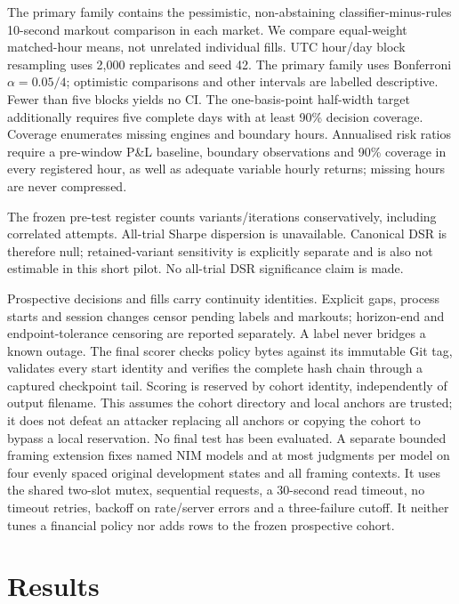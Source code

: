 \documentclass[11pt]{article}
\begin{document}
The primary family contains the pessimistic, non-abstaining classifier-minus-rules
10-second markout comparison in each market. We compare equal-weight matched-hour
means, not unrelated individual fills. UTC hour/day block resampling uses 2,000
replicates and seed 42. The primary family uses Bonferroni $\alpha=0.05/4$; optimistic
comparisons and other intervals are labelled descriptive. Fewer than five blocks
yields no CI. The one-basis-point half-width target additionally requires five
complete days with at least 90\% decision coverage. Coverage enumerates missing
engines and boundary hours. Annualised risk ratios require a pre-window P\&L
baseline, boundary observations and 90\% coverage in every registered hour, as
well as adequate variable hourly returns; missing hours are never compressed.

The frozen pre-test register counts \FrozenTrials{} variants/iterations
conservatively, including correlated attempts. All-trial Sharpe dispersion is
unavailable. Canonical DSR is therefore null; retained-variant sensitivity is
explicitly separate and is also not estimable in this short pilot. No all-trial
DSR significance claim is made.

Prospective decisions and fills carry continuity identities. Explicit gaps,
process starts and session changes censor pending labels and markouts; horizon-end
and endpoint-tolerance censoring are reported separately. A label never bridges
a known outage. The final scorer checks policy bytes against its immutable Git
tag, validates every start identity and verifies the complete hash chain through
a captured checkpoint tail. Scoring is reserved by cohort identity, independently
of output filename. This assumes the cohort directory and local anchors are
trusted; it does not defeat an attacker replacing all anchors or copying the
cohort to bypass a local reservation. No final test has been evaluated. A separate bounded framing extension fixes
\FramingModels{} named NIM models and at most \FramingBudget{} judgments per model
on four evenly spaced original development states and all framing contexts.
It uses the shared two-slot mutex, sequential requests, a 30-second read timeout,
no timeout retries, backoff on rate/server errors and a three-failure cutoff.
It neither tunes a financial policy nor adds rows to the frozen prospective cohort.

\section{Results}
\end{document}
